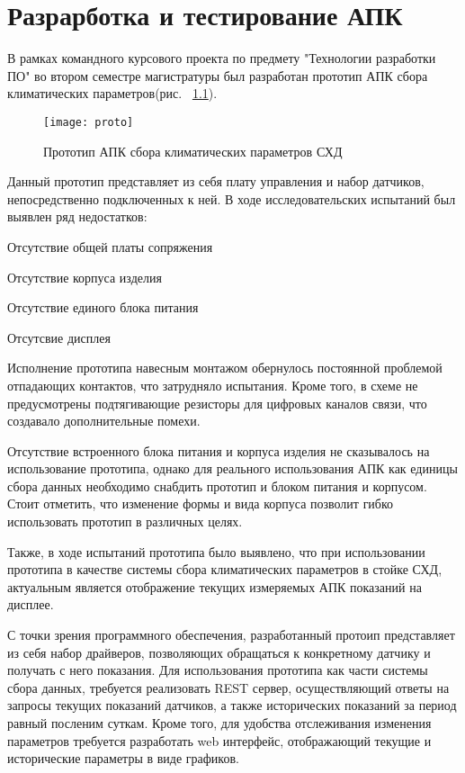 
\chapter{Разрарботка и тестирование АПК}

В рамках командного курсового проекта по предмету "Технологии разработки ПО" во втором семестре магистратуры был разработан прототип АПК сбора климатических параметров(рис.  ~\ref{fig:proto}).

\begin{figure}[H]
	\centering
	\texttt{[image: proto]}
	\caption{Прототип АПК сбора климатических параметров СХД}
	\label{fig:proto}
\end{figure}
Данный прототип представляет из себя плату управления и набор датчиков, непосредственно подключенных к ней. В ходе исследовательских испытаний был выявлен ряд недостатков: 
\begin{itemize*}
	\item{Отсутствие общей платы сопряжения}
	\item{Отсутствие корпуса изделия}
	\item{Отсутствие единого блока питания}
	\item{Отсутсвие дисплея}
\end{itemize*}

Исполнение прототипа навесным монтажом обернулось постоянной проблемой отпадающих контактов, что затрудняло испытания. Кроме того, в схеме не предусмотрены подтягивающие резисторы для цифровых каналов связи, что создавало дополнительные помехи. 

Отсутствие встроенного блока питания и корпуса изделия не сказывалось на использование прототипа, однако для реального использования АПК как единицы сбора данных необходимо снабдить прототип и блоком питания и корпусом. Стоит отметить, что изменение формы и вида корпуса позволит гибко использовать прототип в различных целях.

Также, в ходе испытаний прототипа было выявлено, что при использовании прототипа в качестве системы сбора климатических параметров в стойке СХД, актуальным является отображение текущих измеряемых АПК показаний на дисплее. 

С точки зрения программного обеспечения, разработанный протоип представляет из себя набор драйверов, позволяющих обращаться к конкретному датчику и получать с него показания. Для использования прототипа как части системы сбора данных, требуется реализовать REST сервер, осуществляющий ответы на запросы текущих показаний датчиков, а также исторических показаний за период равный посленим суткам. Кроме того, для удобства отслеживания изменения параметров требуется разработать web интерфейс, отображающий текущие и исторические параметры в виде графиков.

